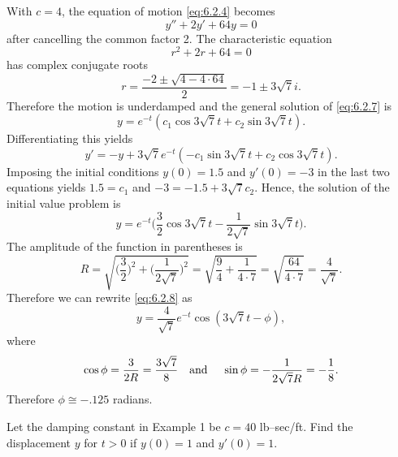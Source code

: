\begin{examplesolution}
\solution With $c=4$, the equation of motion \eqref{eq:6.2.4} becomes
\begin{equation}
  \label{eq:6.2.7}y''+2y'+64y=0
\end{equation}
after cancelling the common factor 2. The characteristic equation
\[
  r^{2}+2r+64=0
\]
has complex conjugate roots
\[
  r=\frac{-2\pm\sqrt{4-4\cdot64}}{2}=-1\pm3\sqrt{7}i.
\]
Therefore the motion is underdamped and the general solution of \eqref{eq:6.2.7} is
\[
  y=e^{-t}(c_{1}\cos3\sqrt{7}t+c_{2}\sin3\sqrt{7}t).
\]
Differentiating this yields
\[
  y'=-y+3\sqrt{7}e^{-t}(-c_{1}\sin3\sqrt{7}t+c_{2}\cos3\sqrt{7}t).
\]
Imposing the initial conditions $y(0)=1.5$ and $y'(0)=-3$ in the last two equations yields
$1.5=c_{1}$ and $-3=-1.5+3\sqrt{7}c_{2}$. Hence, the solution of the initial value problem is
\begin{equation}
  \label{eq:6.2.8}y=e^{-t}\bigg(\frac{3}{2}\cos3\sqrt{7}t-\frac{1}{2\sqrt{7}}\sin3\sqrt{7}t\bigg).
\end{equation}
The amplitude of the function in parentheses is
\[
  R=\sqrt{\bigg(\frac{3}{2}\bigg)^{2}+\bigg(\frac{1}{2\sqrt{7}}\bigg)^{2}}=\sqrt{\frac{9}{4}+\frac{1}{4\cdot7}}=\sqrt{\frac{64}{4\cdot7}}=\frac{4}{\sqrt{7}}.
\]
Therefore we can rewrite \eqref{eq:6.2.8} as
\[
  y=\frac{4}{\sqrt{7}}e^{-t}\cos(3\sqrt{7}t-\phi),
\]
where
\[
  \cos\phi=\frac{3}{2R}=\frac{3\sqrt{7}}{8}\mbox{\quad and \quad}\sin\phi=-\frac{1}{2\sqrt{7}R}= -\frac{1}{8}.
\]
Therefore $\phi\cong-.125$ radians.
\end{examplesolution}

\begin{example}
  \label{example:6.2.3}\rm Let the damping constant in Example 1 be $c=40$ lb--sec/ft. Find the
  displacement $y$ for $t>0$ if $y(0)=1$ and $y'(0)=1$.
\end{example}

